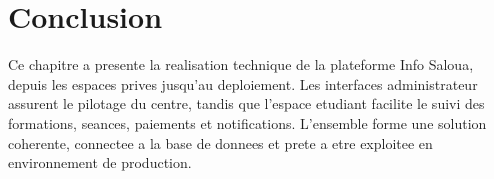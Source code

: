 \section{Conclusion}

Ce chapitre a presente la realisation technique de la plateforme Info Saloua,
depuis les espaces prives jusqu'au deploiement. Les interfaces administrateur
assurent le pilotage du centre, tandis que l'espace etudiant facilite le suivi
des formations, seances, paiements et notifications. L'ensemble forme une
solution coherente, connectee a la base de donnees et prete a etre exploitee en
environnement de production.
